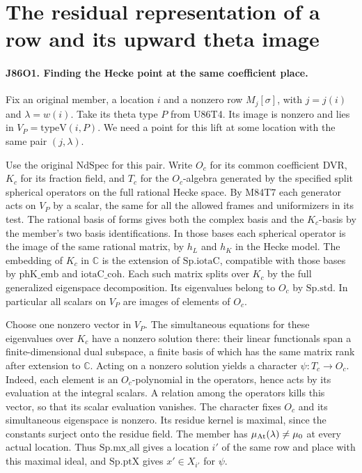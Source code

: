 \section{The residual representation of a row and its upward theta image}

\paragraph{J86O1. Finding the Hecke point at the same coefficient place.}
Fix an original member, a location $i$ and a nonzero row
$M_j[\sigma]$, with $j=j(i)$ and $\lambda=w(i)$.
Take its theta type $P$ from U86T4. Its image is nonzero and
lies in $V_P=\mathrm{typeV}(i,P)$. We need a point for this
lift at some location with the same pair $(j,\lambda)$.

Use the original $\mathrm{NdSpec}$ for this pair. Write $O_c$ for
its common coefficient DVR, $K_c$ for its fraction field, and $T_c$
for the $O_c$-algebra generated by the specified split spherical
operators on the full rational Hecke space.
By M84T7 each generator acts on $V_P$ by a scalar, the same for all
the allowed frames and uniformizers in its test. The rational basis
of forms gives both the complex basis and the $K_c$-basis by the
member's two basis identifications. In those bases each spherical
operator is the image of the same rational matrix, by
$h_L$ and $h_K$ in the Hecke model. The embedding of $K_c$ in
$\mathbb C$ is the extension of $\mathrm{Sp.iotaC}$, compatible
with those bases by $\mathrm{phK\_emb}$ and
$\mathrm{iotaC\_coh}$. Each such matrix splits over $K_c$ by the
full generalized eigenspace decomposition. Its eigenvalues belong to
$O_c$ by $\mathrm{Sp.std}$. In particular all scalars on $V_P$
are images of elements of $O_c$.

Choose one nonzero vector in $V_P$. The simultaneous equations for
these eigenvalues over $K_c$ have a nonzero solution there: their
linear functionals span a finite-dimensional dual subspace, a finite
basis of which has the same matrix rank after extension to
$\mathbb C$. Acting on a nonzero solution yields a character
$\psi:T_c\to O_c$. Indeed, each element is an $O_c$-polynomial
in the operators, hence acts by its evaluation at the integral
scalars. A relation among the operators kills this vector, so that
its scalar evaluation vanishes. The character fixes $O_c$ and its
simultaneous eigenspace is nonzero. Its residue kernel is maximal,
since the constants surject onto the residue field.
The member has $\mu_{\rm At}(\lambda)\ne\mu_0$ at every actual
location. Thus $\mathrm{Sp.mx\_all}$ gives a location $i'$ of
the same row and place with this maximal ideal, and
$\mathrm{Sp.ptX}$ gives $x'\in X_{i'}$ for $\psi$.

